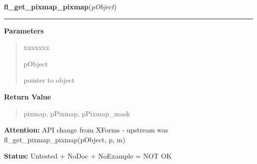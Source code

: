 \hspace{.8\funcindent}\begin{boxedminipage}{\funcwidth}

    \raggedright \textbf{fl\_get\_pixmap\_pixmap}(\textit{pObject})

    \vspace{-1.5ex}

    \rule{\textwidth}{0.5\fboxrule}
\setlength{\parskip}{2ex}
\setlength{\parskip}{1ex}
      \textbf{Parameters}
      \vspace{-1ex}

      \begin{quote}
        \begin{Ventry}{xxxxxxx}

          \item[pObject]

          pointer to object

        \end{Ventry}

      \end{quote}

      \textbf{Return Value}
    \vspace{-1ex}

      \begin{quote}
      pixmap, pPixmap, pPixmap\_mask

      \end{quote}

\textbf{Attention:} API change from XForms - upstream was fl\_get\_pixmap\_pixmap(pObject, p, 
m)



\textbf{Status:} Untested + NoDoc + NoExample = NOT OK



    \end{boxedminipage}

    \label{xformslib:library:fl_read_pixmapfile}

    \vspace{0.5ex}

